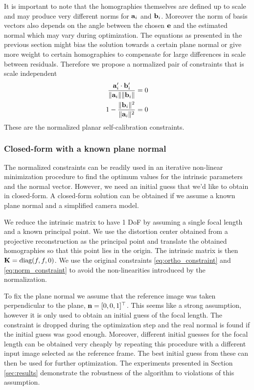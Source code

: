 \documentclass[10pt,twocolumn,letterpaper]{article}
\begin{document}
It is important to note that the homographies themselves are defined up to scale and may produce very different norms for $\mathbf{a}_i$ and $\mathbf{b}_i$. Moreover the norm of basis vectors also depends on the angle between the chosen $\mathbf{e}$ and the estimated normal which may vary during optimization. The equations as presented in the previous section might bias the solution towards a certain plane normal or give more weight to certain homographies to compensate for large differences in scale between residuals. Therefore we propose a normalized pair of constraints that is scale independent 
\begin{align}
\frac{\mathbf{a}_i' \cdot \mathbf{b}_i'}{\lVert\mathbf{a}_i\rVert \lVert\mathbf{b}_i\rVert} = 0 \label{eq:ortho_constraint_normalized}\\
1 - \frac{\lVert\mathbf{b}_i\rVert^2}{\lVert\mathbf{a}_i\rVert^2} = 0 \label{eq:norm_constraint_normalized}
\end{align}
These are the normalized planar self-calibration constraints.

\subsubsection{Closed-form with a known plane normal}
\label{sec:calib:closed}

The normalized constraints can be readily used in an iterative non-linear minimization procedure to find the optimum values for the intrinsic parameters and the normal vector. However, we need an initial guess that we'd like to obtain in closed-form. A closed-form solution can be obtained if we assume a known plane normal and a simplified camera model. 

We reduce the intrinsic matrix to have 1 DoF by assuming a single focal length and a known principal point. We use the distortion center obtained from a projective reconstruction as the principal point and translate the obtained homographies so that this point lies in the origin. The intrinsic matrix is then $\mathbf{K}=\text{diag}(f, f, 0)$. We use the original constraints \eqref{eq:ortho_constraint} and \eqref{eq:norm_constraint} to avoid the non-linearities introduced by the normalization.

To fix the plane normal we assume that the reference image was taken perpendicular to the plane, \ie $\mathbf{n}=[0,0,1]^\top$. This seems like a strong assumption, however it is only used to obtain an initial guess of the focal length. The constraint is dropped during the optimization step and the real normal is found if the initial guess was good enough. Moreover, different initial guesses for the focal length can be obtained very cheaply by repeating this procedure with a different input image selected as the reference frame. The best initial guess from these can then be used for further optimization. The experiments presented in Section \ref{sec:results} demonstrate the robustness of the algorithm to violations of this assumption.
\end{document}
